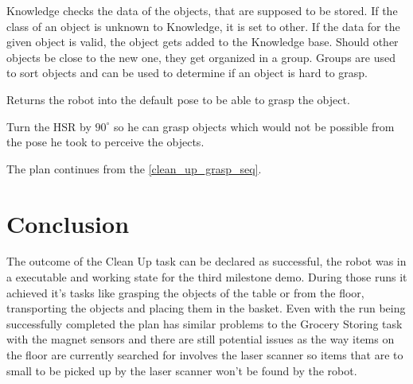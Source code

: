 \documentclass[main.tex]{subfiles}
\begin{document}
    
    Knowledge checks the data of the objects, that are supposed to be stored. If the class of an object is unknown to Knowledge, it is set to other. If the data for the given object is valid, the object gets added to the Knowledge base. Should other objects be close to the new one, they get organized in a group. Groups are used to sort objects and can be used to determine if an object is hard to grasp.
    
   	Returns the robot into the default pose to be able to grasp the object.

    Turn the HSR by $90^\circ$ so he can grasp objects which would not be possible from the pose he took to perceive the objects.

    The plan continues from the \ref{clean_up_grasp_seq}.
    
    
	\section{Conclusion}
	The outcome of the Clean Up task can be declared as successful, the robot was in a executable and working state for the third milestone demo. During those runs it achieved it's tasks like grasping the objects of the table or from the floor, transporting the objects and placing them in the basket.
	Even with the run being successfully completed the plan has similar problems to the Grocery Storing task with the magnet sensors and there are still potential issues as the way items on the floor are currently searched for involves the laser scanner so items that are to small to be picked up by the laser scanner won't be found by the robot.
	\endgroup
\end{document}
